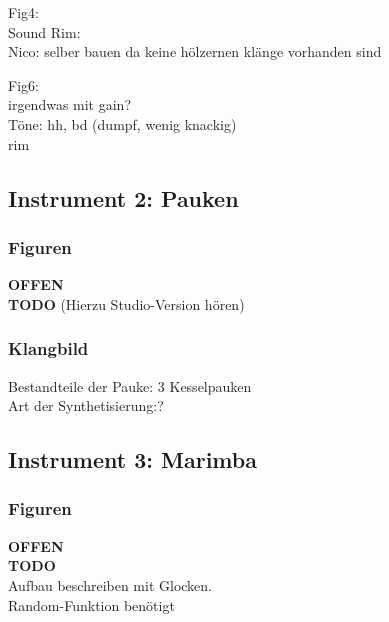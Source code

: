 \documentclass[
10pt, %
a4paper, %
oneside, %
headinclude,footinclude, %
BCOR5mm, %
]{scrartcl}
\begin{document}
Fig4:\\
Sound Rim: \\
Nico: selber bauen da keine hölzernen klänge vorhanden sind

Fig6:\\
irgendwas mit gain?\\



Töne: hh, bd (dumpf, wenig knackig)\\
rim

\subsection{Instrument 2: Pauken}
\subsubsection{Figuren}
{\color{red}\textbf{OFFEN}} \\
{\color{red}\textbf{TODO}}
(Hierzu Studio-Version hören)\\

\subsubsection{Klangbild}
Bestandteile der Pauke: 3 Kesselpauken\\
Art der Synthetisierung:?\\


\subsection{Instrument 3: Marimba}
\subsubsection{Figuren}
{\color{red}\textbf{OFFEN}} \\
{\color{red}\textbf{TODO}}\\
Aufbau beschreiben mit Glocken.\\
Random-Funktion benötigt
\end{document}
